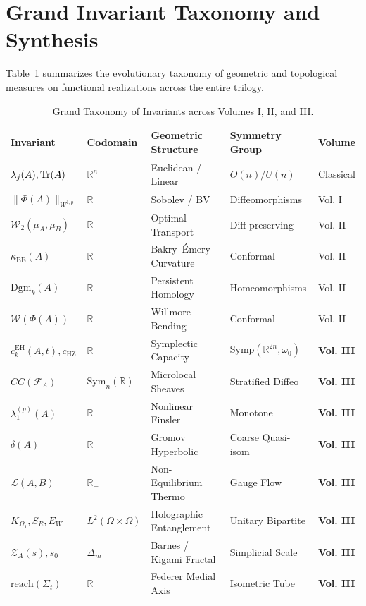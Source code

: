 \documentclass[11pt,a4paper,reqno]{amsart}
\theoremstyle{definition}
\theoremstyle{remark}
\numberwithin{equation}{section}
\begin{document}
\section{Grand Invariant Taxonomy and Synthesis}
\label{sec:taxonomy}

Table~\ref{tab:taxonomy} summarizes the evolutionary taxonomy of geometric and topological measures on functional realizations across the entire trilogy.

\begin{table}[htbp]
\centering
\small
\caption{Grand Taxonomy of Invariants across Volumes I, II, and III.}
\label{tab:taxonomy}
\begin{tabular}{lllll}
\toprule
\textbf{Invariant} & \textbf{Codomain} & \textbf{Geometric Structure} & \textbf{Symmetry Group} & \textbf{Volume} \\
\midrule
$\lambda_j(A), \Tr(A)$ & $\mathbb{R}^n$ & Euclidean / Linear & $O(n) / U(n)$ & Classical \\
$\|\Phi(A)\|_{W^{1,p}}$ & $\mathbb{R}$ & Sobolev / BV & Diffeomorphisms & Vol. I \\
$\mathcal{W}_2(\mu_A, \mu_B)$ & $\mathbb{R}_+$ & Optimal Transport & Diff-preserving & Vol. II \\
$\kappa_{\mathrm{BE}}(A)$ & $\mathbb{R}$ & Bakry--Émery Curvature & Conformal & Vol. II \\
$\mathrm{Dgm}_k(A)$ & $\mathbb{R}$ & Persistent Homology & Homeomorphisms & Vol. II \\
$\mathcal{W}(\Phi(A))$ & $\mathbb{R}$ & Willmore Bending & Conformal & Vol. II \\
\midrule
$c_k^{\mathrm{EH}}(A, t), c_{\mathrm{HZ}}$ & $\mathbb{R}$ & Symplectic Capacity & $\mathrm{Symp}(\mathbb{R}^{2n}, \omega_0)$ & \textbf{Vol. III} \\
$CC(\mathcal{F}_A)$ & $\mathrm{Sym}_n(\mathbb{R})$ & Microlocal Sheaves & Stratified Diffeo & \textbf{Vol. III} \\
$\lambda_1^{(p)}(A)$ & $\mathbb{R}$ & Nonlinear Finsler & Monotone & \textbf{Vol. III} \\
$\delta(A)$ & $\mathbb{R}$ & Gromov Hyperbolic & Coarse Quasi-isom & \textbf{Vol. III} \\
$\mathcal{L}(A, B)$ & $\mathbb{R}_+$ & Non-Equilibrium Thermo & Gauge Flow & \textbf{Vol. III} \\
$K_{\Omega_1}, S_R, E_W$ & $L^2(\Omega \times \Omega)$ & Holographic Entanglement & Unitary Bipartite & \textbf{Vol. III} \\
$\mathcal{Z}_A(s), s_0$ & $\Delta_m$ & Barnes / Kigami Fractal & Simplicial Scale & \textbf{Vol. III} \\
$\mathrm{reach}(\Sigma_t)$ & $\mathbb{R}$ & Federer Medial Axis & Isometric Tube & \textbf{Vol. III} \\
\bottomrule
\end{tabular}
\end{table}
\end{document}

